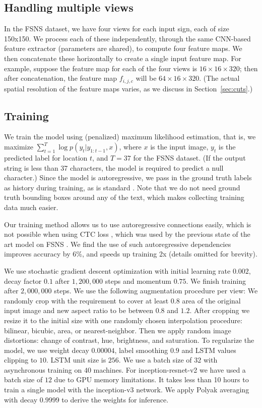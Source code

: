 \documentclass[conference]{IEEEtran}
\begin{document}
\subsection{Handling multiple views}

In the FSNS dataset, we have four views for each input sign,
each of size 150x150. We process each of these independently, through
the same CNN-based feature extractor (parameters are shared), to
compute four feature maps.
We then concatenate these horizontally
to create a single input feature map.
For example, suppose the feature map for each
of the four views
is $16 \times 16 \times 320$;
then after concatenation, the feature map
$f_{i,j,c}$ will be $64 \times 16 \times 320$.
(The actual spatial resolution of the feature maps varies,
as we discuss in Section~\ref{sec:cuts}.)


\subsection{Training}

We train the model using (penalized) maximum likelihood estimation,
that is, we maximize $\sum_{t=1}^T \log p(y_t|y_{1:t-1},x)$, where $x$
is the input image, $y_t$ is the predicted label for location $t$, and
$T=37$ for the FSNS dataset. (If the output string is less than 37
characters, the model is required to predict a null character.)
Since the model is autoregressive,
we pass in the ground truth labels as history during training,
as is standard \cite{Sutskever2014}.
Note that we do not need ground truth bounding boxes around any of the
text, which makes collecting training data much easier.

Our training method
allows us to use autoregressive connections easily,
which is not possible  when using CTC loss \cite{graves2006connectionist},
which was used by 
the previous state of the art model on FSNS \cite{smith2016end}.
We find the use of such autoregressive dependencies
improves  accuracy by 6\%, and speeds up training 2x
(details omitted for brevity).

We use stochastic gradient descent optimization with initial learning
rate $0.002$, decay factor $0.1$ after $1,200,000$ steps and momentum
$0.75$. We finish training after $2,000,000$ steps. We use the following augmentation procedure per view: We
randomly crop with the requirement to cover at least $0.8$ area of the
original input image and new aspect ratio to be between $0.8$ and
$1.2$. After cropping we resize it to the initial size with one
randomly chosen interpolation procedure: bilinear, bicubic, area, or
nearest-neighbor. Then we apply random image distortions: change of
contrast, hue, brightness, and saturation. To regularize the model, we
use weight decay $0.00004$, label smoothing $0.9$ \cite{szegedy2015rethinking} and LSTM values
clipping to $10$. LSTM unit size is $256$. We use a batch size of $32$
with asynchronous training on $40$ machines. For inception-resnet-v2 we have
used a batch size of $12$ due to GPU memory limitations. It takes less than 10
hours to train a single model with the inception-v3 network. We apply Polyak averaging
\cite{polyak1992acceleration} with decay $0.9999$ to derive the
weights for inference. 
\end{document}
